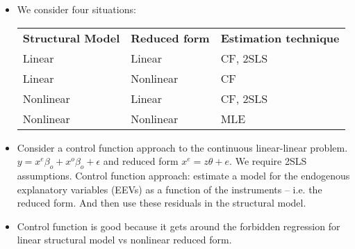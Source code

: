 \documentclass[12pt]{article}
\begin{document}
\begin{itemize}
    \item We consider four situations:
          \begin{table}[htbp]
              \centering\begin{tabular}{ l l l }
                  \textbf{Structural Model} & \textbf{Reduced form} & \textbf{Estimation technique} \\  [0.5ex]
                  Linear                    & Linear                & CF, 2SLS                      \\
                  Linear                    & Nonlinear             & CF                            \\
                  Nonlinear                 & Linear                & CF, 2SLS                      \\
                  Nonlinear                 & Nonlinear             & MLE
              \end{tabular}

          \end{table}

    \item Consider a control function approach to the continuous linear-linear problem.
          $y = x^{e}\beta_{o} + x^{o}\beta_{o} + \epsilon$ and reduced form $x^{e} = z \theta + e $.
          We require 2SLS assumptions.
          Control function approach: estimate a model for the endogenous explanatory variables (EEVs)
          as a function of the instruments -- i.e. the reduced form.
          And then use these residuals in the structural model.
    \item Control function is good because it gets around the forbidden regression for linear structural model
          vs nonlinear reduced form.




\end{itemize}
\end{document}
